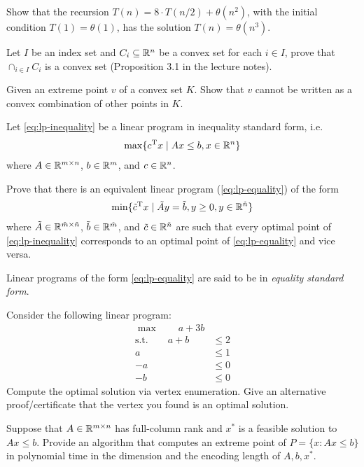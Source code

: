 \documentclass[11pt]{article}
\institute{\'Ecole Polytechnique F\'ed\'erale de Lausanne}
\begin{document}
\makeheader

\problem
Show that the recursion 
$T(n) = 8 \cdot T(n/2) + \theta(n^2)$, with the initial condition $T(1)=\theta(1)$,
has the solution $T(n) = \theta(n^3)$. 

\problem
Let $I$ be an index set and $C_i \subseteq \mathbb{R}^n$ be a convex set for each $i \in I$, prove that $\cap_{i \in I}C_i$ is a convex set (Proposition 3.1 in the lecture notes). 

\problem
Given an extreme point $v$ of a convex set $K$. Show that $v$ cannot be written as a convex combination of
other points in $K$.

\problem 
Let \eqref{eq:lp-inequality} be a linear program in inequality standard form, i.e.
\begin{align} \label{eq:lp-inequality}
\max\{ c^{\textnormal{T}} x \mid Ax \le b, x \in \mathbb{R}^n \}
\end{align}
where $A \in \mathbb{R}^{m \times n}$, $b\in \mathbb{R}^m$, and $c\in\mathbb{R}^n$.

Prove that there is an equivalent linear program (\ref{eq:lp-equality}) of the form
\begin{align} \label{eq:lp-equality}
\min\{ \tilde c^{\textnormal{T}} x \mid \tilde Ay = \tilde b, y \ge 0, y \in \mathbb{R}^{\tilde n} \}
\end{align}
where $\tilde A \in \mathbb{R}^{\tilde m \times \tilde n}$, $\tilde b \in \mathbb{R}^{\tilde m}$, and $\tilde c \in \mathbb{R}^{\tilde n}$
are such that every optimal point of \eqref{eq:lp-inequality} corresponds to an optimal point of \eqref{eq:lp-equality}
and vice versa.

Linear programs of the form \eqref{eq:lp-equality} are said to be in \emph{equality standard form}.

\problem
Consider the following linear program:
\begin{align*}
	\max \qquad a + 3b \\
	\text{s.t.} \qquad a + b &\le 2 \\
	  a &\le 1 \\
		-a &\le 0 \\
		-b &\le 0
\end{align*}
Compute the optimal solution via vertex enumeration. Give an alternative proof/certificate that the vertex you found is an optimal solution.

\problemstar
Suppose that $A\in \mathbb{R}^{m\times n}$ has full-column rank and $x^*$ is a feasible solution to $Ax \leq b$. Provide an algorithm that computes an extreme point of $P = \{x : Ax \leq b\}$ in polynomial time in the dimension and the encoding length of $A,b,x^*$.
\end{document}
